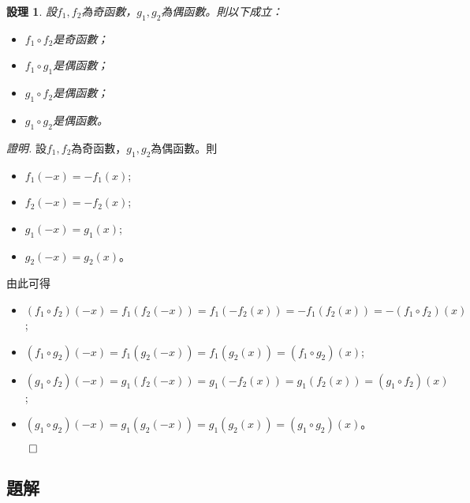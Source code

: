\documentclass[12pt]{article}
\newtheorem*{proposition}{設理}
\renewenvironment*{proof}{\textit{證明.}}{\hfill$\qed$}
\begin{document}
    \begin{proposition}
        設$f_1,f_2$為奇函數，$g_1,g_2$為偶函數。則以下成立：\begin{itemize}
            \item $f_1\circ f_2$是奇函數；
            \item $f_1\circ g_1$是偶函數；
            \item $g_1\circ f_2$是偶函數；
            \item $g_1\circ g_2$是偶函數。
        \end{itemize}
    \end{proposition}

    \begin{proof}
        設$f_1,f_2$為奇函數，$g_1,g_2$為偶函數。則\begin{itemize}
            \item $f_1(-x)=-f_1(x)$;
            \item $f_2(-x)=-f_2(x)$;
            \item $g_1(-x)=g_1(x)$;
            \item $g_2(-x)=g_2(x)$。
        \end{itemize}
        由此可得\begin{itemize}
            \item $(f_1\circ f_2)(-x)=f_1(f_2(-x))=f_1(-f_2(x))=-f_1(f_2(x))=-(f_1\circ f_2)(x)$;
            \item $(f_1\circ g_2)(-x)=f_1(g_2(-x))=f_1(g_2(x))=(f_1\circ g_2)(x)$;
            \item $(g_1\circ f_2)(-x)=g_1(f_2(-x))=g_1(-f_2(x))=g_1(f_2(x))=(g_1\circ f_2)(x)$;
            \item $(g_1\circ g_2)(-x)=g_1(g_2(-x))=g_1(g_2(x))=(g_1\circ g_2)(x)$。
        \end{itemize}
    \end{proof}

    \subsection*{題解}
\end{document}
